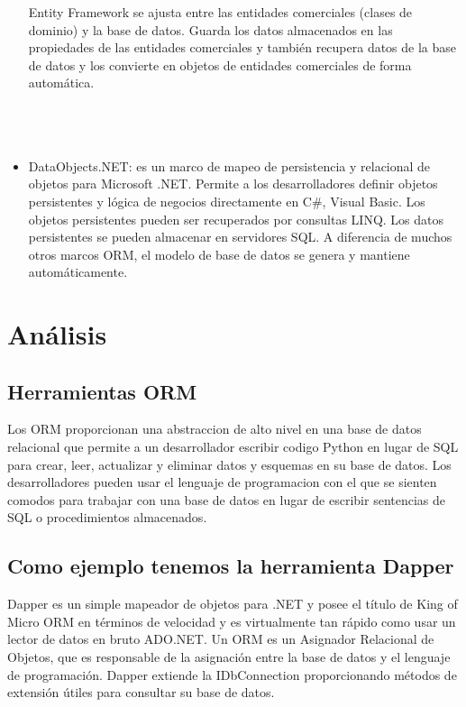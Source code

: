 \documentclass[preprint,12pt]{elsarticle}
\begin{document}
\begin{itemize}
 Entity Framework se ajusta entre las entidades comerciales (clases de dominio) y la base de datos. Guarda los datos almacenados en las propiedades de las entidades comerciales y también recupera datos de la base de datos y los convierte en objetos de entidades comerciales de forma automática.\\
\\
\\
\\
	\item DataObjects.NET: es un marco de mapeo de persistencia y relacional de objetos para Microsoft .NET. Permite a los desarrolladores definir objetos persistentes y lógica de negocios directamente en C\#, Visual Basic. Los objetos persistentes pueden ser recuperados por consultas LINQ. Los datos persistentes se pueden almacenar en servidores SQL. A diferencia de muchos otros marcos ORM, el modelo de base de datos se genera y mantiene automáticamente.\cite{do} \\
\end{itemize}



 



\section{Análisis}

\subsection{\textbf{Herramientas ORM}}
Los ORM proporcionan una abstraccion de alto nivel
en una base de datos relacional que permite a un desarrollador escribir codigo Python en lugar de SQL para crear, leer, actualizar y eliminar datos y esquemas en su base de datos. Los desarrolladores pueden usar el lenguaje de programacion con el que se sienten comodos para trabajar con una base de datos en lugar de escribir sentencias de SQL o procedimientos almacenados.\\

\subsection{\textbf{Como ejemplo tenemos la herramienta Dapper}}
Dapper es un simple mapeador de objetos para .NET y posee el título de King of Micro ORM en términos de velocidad y es virtualmente tan rápido como usar un lector de datos en bruto ADO.NET. Un ORM es un Asignador Relacional de Objetos, que es responsable de la asignación entre la base de datos y el lenguaje de programación.
Dapper extiende la IDbConnection proporcionando métodos de extensión útiles para consultar su base de datos. \citep{DapperNet}
\end{document}
